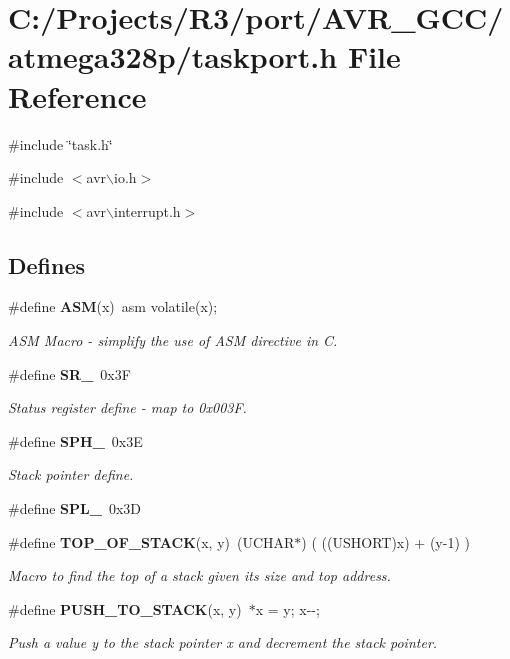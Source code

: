 \section{C:/Projects/R3/port/AVR\_\-GCC/atmega328p/taskport.h File Reference}
\label{taskport_8h}
{\ttfamily \#include \char`\"{}task.h\char`\"{}}\par
{\ttfamily \#include $<$avr$\backslash$io.h$>$}\par
{\ttfamily \#include $<$avr$\backslash$interrupt.h$>$}\par
\subsection*{Defines}
\begin{DoxyCompactItemize}
\item 
\#define {\bf ASM}(x)~asm volatile(x);
\begin{DoxyCompactList}\small\item\em ASM Macro -\/ simplify the use of ASM directive in C. \item\end{DoxyCompactList}\item 
\#define {\bf SR\_\-}~0x3F
\begin{DoxyCompactList}\small\item\em Status register define -\/ map to 0x003F. \item\end{DoxyCompactList}\item 
\#define {\bf SPH\_\-}~0x3E
\begin{DoxyCompactList}\small\item\em Stack pointer define. \item\end{DoxyCompactList}\item 
\#define {\bf SPL\_\-}~0x3D
\item 
\#define {\bf TOP\_\-OF\_\-STACK}(x, y)~(UCHAR$\ast$) ( ((USHORT)x) + (y-\/1) )
\begin{DoxyCompactList}\small\item\em Macro to find the top of a stack given its size and top address. \item\end{DoxyCompactList}\item 
\#define {\bf PUSH\_\-TO\_\-STACK}(x, y)~$\ast$x = y; x-\/-\/;
\begin{DoxyCompactList}\small\item\em Push a value y to the stack pointer x and decrement the stack pointer. \item\end{DoxyCompactList}\item 

\end{DoxyCompactItemize}
